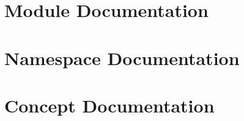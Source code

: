 \documentclass[twoside]{book}
\newcommand{\+}{\discretionary{\mbox{\scriptsize$\hookleftarrow$}}{}{}}
\begin{document}
\chapter{Module Documentation}


















\chapter{Namespace Documentation}































\chapter{Concept Documentation}
























































\end{document}
